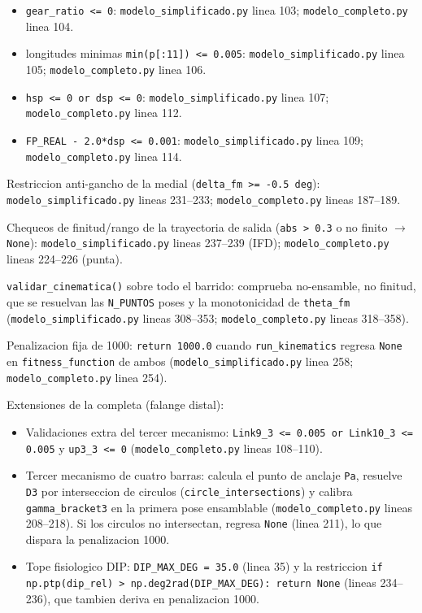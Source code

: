 \documentclass[11pt,a4paper]{article}
\newcommand{\code}[1]{\texttt{#1}}
\begin{document}
\begin{itemize}[leftmargin=1.4em]
  \item \code{gear\_ratio <= 0}: \code{modelo\_simplificado.py} linea 103;
        \code{modelo\_completo.py} linea 104.
  \item longitudes minimas \code{min(p[:11]) <= 0.005}:
        \code{modelo\_simplificado.py} linea 105; \code{modelo\_completo.py}
        linea 106.
  \item \code{hsp <= 0 or dsp <= 0}: \code{modelo\_simplificado.py} linea 107;
        \code{modelo\_completo.py} linea 112.
  \item \code{FP\_REAL - 2.0*dsp <= 0.001}: \code{modelo\_simplificado.py}
        linea 109; \code{modelo\_completo.py} linea 114.
\end{itemize}

Restriccion anti-gancho de la medial (\code{delta\_fm >= -0.5 deg}):
\code{modelo\_simplificado.py} lineas 231--233; \code{modelo\_completo.py}
lineas 187--189.

Chequeos de finitud/rango de la trayectoria de salida (\code{abs > 0.3} o no
finito $\to$ \code{None}): \code{modelo\_simplificado.py} lineas 237--239 (IFD);
\code{modelo\_completo.py} lineas 224--226 (punta).

\code{validar\_cinematica()} sobre todo el barrido: comprueba no-ensamble, no
finitud, que se resuelvan las \code{N\_PUNTOS} poses y la monotonicidad de
\code{theta\_fm} (\code{modelo\_simplificado.py} lineas 308--353;
\code{modelo\_completo.py} lineas 318--358).

Penalizacion fija de 1000: \code{return 1000.0} cuando \code{run\_kinematics}
regresa \code{None} en \code{fitness\_function} de ambos
(\code{modelo\_simplificado.py} linea 258; \code{modelo\_completo.py} linea 254).

Extensiones de la completa (falange distal):

\begin{itemize}[leftmargin=1.4em]
  \item Validaciones extra del tercer mecanismo:
        \code{Link9\_3 <= 0.005 or Link10\_3 <= 0.005} y \code{up3\_3 <= 0}
        (\code{modelo\_completo.py} lineas 108--110).
  \item Tercer mecanismo de cuatro barras: calcula el punto de anclaje \code{Pa},
        resuelve \code{D3} por interseccion de circulos
        (\code{circle\_intersections}) y calibra \code{gamma\_bracket3} en la
        primera pose ensamblable (\code{modelo\_completo.py} lineas 208--218). Si
        los circulos no intersectan, regresa \code{None} (linea 211), lo que
        dispara la penalizacion 1000.
  \item Tope fisiologico DIP: \code{DIP\_MAX\_DEG = 35.0} (linea 35) y la
        restriccion \code{if np.ptp(dip\_rel) > np.deg2rad(DIP\_MAX\_DEG): return None}
        (lineas 234--236), que tambien deriva en penalizacion 1000.
\end{itemize}
\end{document}
